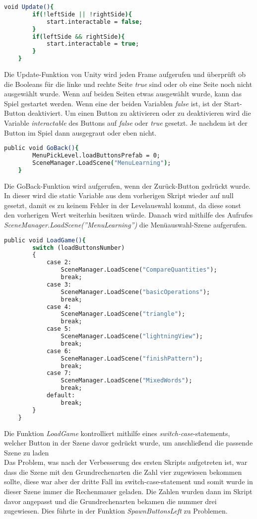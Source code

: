 \begin{lstlisting}[language=csh, caption={MenuPickLevelAdvanced.cs Update-Funktion}]
	void Update(){
		if(!leftSide || !rightSide){
			start.interactable = false;
		}
		if(leftSide && rightSide){
			start.interactable = true;
		}
	}
\end{lstlisting}
Die Update-Funktion von Unity wird jeden Frame aufgerufen und überprüft ob die Booleans für die linke und rechte Seite \textit{true} sind oder ob eine Seite noch nicht ausgewählt wurde. Wenn auf beiden Seiten etwas ausgewählt wurde, kann das Spiel gestartet werden. Wenn eine der beiden Variablen \textit{false} ist, ist der Start-Button deaktiviert. Um einen Button zu aktivieren oder zu deaktivieren wird die Variable \textit{interactable} des Buttons auf \textit{false} oder \textit{true} gesetzt. Je nachdem ist der Button im Spiel dann ausgegraut oder eben nicht.\\
\begin{lstlisting}[language=csh, caption={MenuPickLevelAdvanced.cs GoBack-Funktion}]
	public void GoBack(){
		MenuPickLevel.loadButtonsPrefab = 0;
		SceneManager.LoadScene("MenuLearning");
	}
\end{lstlisting}
Die GoBack-Funktion wird aufgerufen, wenn der Zurück-Button gedrückt wurde. In dieser wird die static Variable aus dem vorherigen Skript wieder auf null gesetzt, damit es zu keinem Fehler in der Levelauswahl kommt, da diese sonst den vorherigen Wert weiterhin besitzen würde. Danach wird mithilfe des Aufrufes \textit{SceneManager.LoadScene(''MenuLearning'')} die Menüauswahl-Szene aufgerufen.
\begin{lstlisting}[language=csh, caption={MenuPickLevelAdvanced.cs LoadGame-Funktion}]
	public void LoadGame(){
		switch (loadButtonsNumber)
		{
			case 2:
				SceneManager.LoadScene("CompareQuantities");
				break;
			case 3:
				SceneManager.LoadScene("basicOperations");
				break;
			case 4:
				SceneManager.LoadScene("triangle");
				break;
			case 5:
				SceneManager.LoadScene("lightningView");
				break;
			case 6:
				SceneManager.LoadScene("finishPattern");
				break;
			case 7:
				SceneManager.LoadScene("MixedWords");
				break;
			default:
				break;
		}
	}
\end{lstlisting}
Die Funktion \textit{LoadGame} kontrolliert mithilfe eines \textit{switch-case}-statements, welcher Button in der Szene davor gedrückt wurde, um anschließend die passende Szene zu laden\\
Das Problem, was nach der Verbesserung des ersten Skripts aufgetreten ist, war dass die Szene mit den Grundrechenarten die Zahl vier zugewiesen bekommen sollte, diese war aber der dritte Fall im switch-case-statement und somit wurde in dieser Szene immer die Rechenmauer geladen. Die Zahlen wurden dann im Skript davor angepasst und die Grundrechenarten bekamen die nummer drei zugewiesen. Dies führte in der Funktion \textit{SpawnButtonsLeft} zu Problemen.\\
